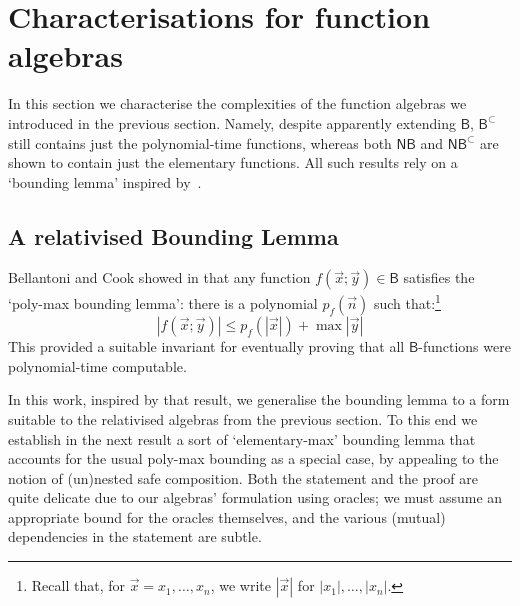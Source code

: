 \documentclass[10pt,a4paper]{amsart}
\theoremstyle{definition}
\theoremstyle{remark}
\newcommand{\permpref}{\subset}
\newcommand{\bc}{\mathsf{B}}
\newcommand{\bcwfpo}[1]{\bc^{#1}}
\newcommand{\nested}{\mathsf{N}}
\newcommand{\nbc}{\nested\bc}
\newcommand{\nbcwfpo}[1]{\nested\bcwfpo{#1}}
\newcommand{\bcpp}{\bcwfpo{\permpref}}
\newcommand{\nbcpp}{\nbcwfpo{\permpref}}
\begin{document}
\section{Characterisations for function algebras}\label{sec:characterization-results-for-function-algebras}
In this section we characterise the complexities  of the function algebras we introduced in the previous section. 
Namely, despite apparently extending $\bc$, $\bcpp$ still contains just the polynomial-time functions, whereas  both  $\nbc$ and $\nbcpp$ are shown to contain just the elementary functions. 
All such results rely on a `bounding lemma' inspired by~\cite{BellantoniCook}.




\subsection{A relativised Bounding Lemma}
\label{sec:bounding-lemma}
Bellantoni and Cook showed in \cite{BellantoniCook} that any function $f(\vec x;\vec y) \in \bc$ satisfies the `poly-max bounding lemma': there is a polynomial $p_f(\vec n)$ such that:\footnote{Recall that, for $\vec x = x_1, \dots, x_n$, we write $|\vec x|$ for $|x_1|, \dots, |x_n|$.}
\begin{equation}
    \label{eq:bc-polymax-eqn}
    |f(\vec x;\vec y)| \leq p_f (|\vec x|) + \max |\vec y| 
\end{equation}
This provided a suitable invariant for eventually proving that all $\bc$-functions were polynomial-time computable.

In this work, inspired by that result, we generalise the bounding lemma to a form suitable to the relativised algebras from the previous section. 
To this end we establish in the next result a sort of `elementary-max' bounding lemma that accounts for the usual poly-max bounding as a special case, by appealing to the notion of (un)nested safe composition.
Both the statement and the proof are quite delicate due to our algebras' formulation using oracles; we must assume an appropriate bound for the oracles themselves, and the various (mutual) dependencies in the statement are subtle.
\end{document}
